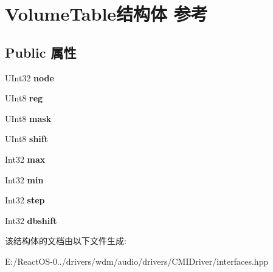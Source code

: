 \hypertarget{struct_volume_table}{}\section{Volume\+Table结构体 参考}
\label{struct_volume_table}
\subsection*{Public 属性}
\begin{DoxyCompactItemize}
\item 
\mbox{\label{struct_volume_table_ad6e6601a1d0bfef6f1aaa055f07e7add}} 
U\+Int32 {\bfseries node}
\item 
\mbox{\label{struct_volume_table_a802a0f14e9ae4990f2df7e194e48d23d}} 
U\+Int8 {\bfseries reg}
\item 
\mbox{\label{struct_volume_table_ac1d156f88e45561a33e66375fce01365}} 
U\+Int8 {\bfseries mask}
\item 
\mbox{\label{struct_volume_table_a530744e2caad2957bcdb73bb3b614274}} 
U\+Int8 {\bfseries shift}
\item 
\mbox{\label{struct_volume_table_a66ee10a963ff572ca9ceda904bfc98df}} 
Int32 {\bfseries max}
\item 
\mbox{\label{struct_volume_table_a968824ccba0823bda2f9f7ebb797f245}} 
Int32 {\bfseries min}
\item 
\mbox{\label{struct_volume_table_a60d85345d0e27b8d067047bef1b0de8f}} 
Int32 {\bfseries step}
\item 
\mbox{\label{struct_volume_table_a28edbc55d4d53e370f986ff9a6981878}} 
Int32 {\bfseries dbshift}
\end{DoxyCompactItemize}


该结构体的文档由以下文件生成\+:\begin{DoxyCompactItemize}
\item 
E\+:/\+React\+O\+S-\/0../drivers/wdm/audio/drivers/\+C\+M\+I\+Driver/interfaces.\+hpp\end{DoxyCompactItemize}
